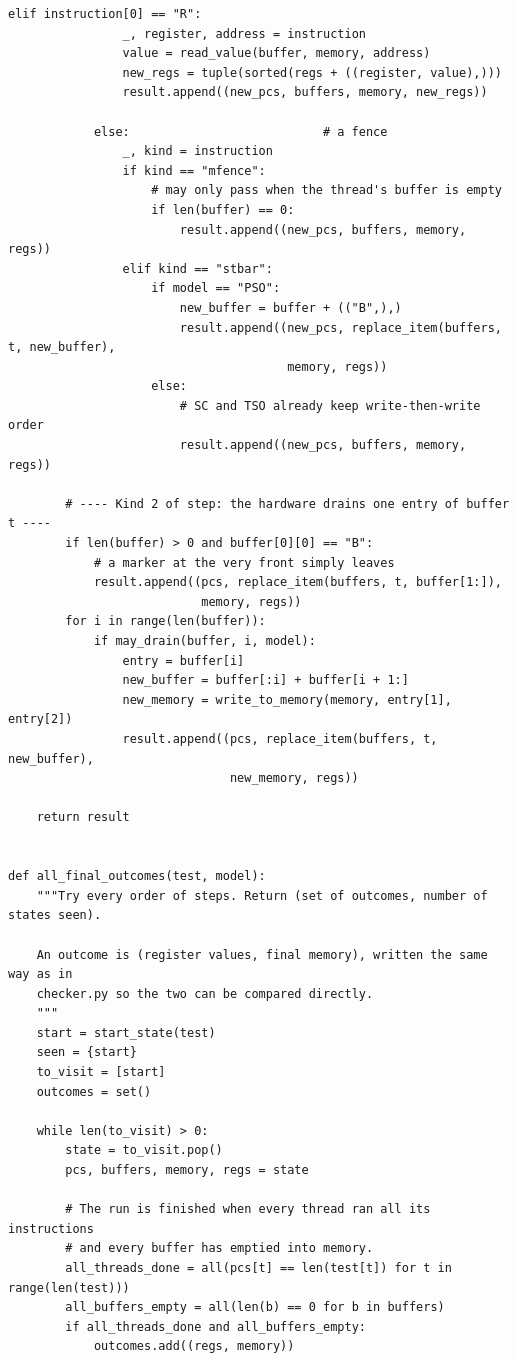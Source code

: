 \begin{lstlisting}[style=vspython]
            elif instruction[0] == "R":
                _, register, address = instruction
                value = read_value(buffer, memory, address)
                new_regs = tuple(sorted(regs + ((register, value),)))
                result.append((new_pcs, buffers, memory, new_regs))

            else:                           # a fence
                _, kind = instruction
                if kind == "mfence":
                    # may only pass when the thread's buffer is empty
                    if len(buffer) == 0:
                        result.append((new_pcs, buffers, memory, regs))
                elif kind == "stbar":
                    if model == "PSO":
                        new_buffer = buffer + (("B",),)
                        result.append((new_pcs, replace_item(buffers, t, new_buffer),
                                       memory, regs))
                    else:
                        # SC and TSO already keep write-then-write order
                        result.append((new_pcs, buffers, memory, regs))

        # ---- Kind 2 of step: the hardware drains one entry of buffer t ----
        if len(buffer) > 0 and buffer[0][0] == "B":
            # a marker at the very front simply leaves
            result.append((pcs, replace_item(buffers, t, buffer[1:]),
                           memory, regs))
        for i in range(len(buffer)):
            if may_drain(buffer, i, model):
                entry = buffer[i]
                new_buffer = buffer[:i] + buffer[i + 1:]
                new_memory = write_to_memory(memory, entry[1], entry[2])
                result.append((pcs, replace_item(buffers, t, new_buffer),
                               new_memory, regs))

    return result


def all_final_outcomes(test, model):
    """Try every order of steps. Return (set of outcomes, number of states seen).

    An outcome is (register values, final memory), written the same way as in
    checker.py so the two can be compared directly.
    """
    start = start_state(test)
    seen = {start}
    to_visit = [start]
    outcomes = set()

    while len(to_visit) > 0:
        state = to_visit.pop()
        pcs, buffers, memory, regs = state

        # The run is finished when every thread ran all its instructions
        # and every buffer has emptied into memory.
        all_threads_done = all(pcs[t] == len(test[t]) for t in range(len(test)))
        all_buffers_empty = all(len(b) == 0 for b in buffers)
        if all_threads_done and all_buffers_empty:
            outcomes.add((regs, memory))


\end{lstlisting}
